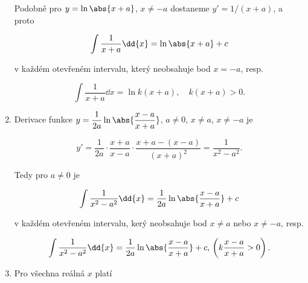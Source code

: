 \begin{enumerate}
            Podobně pro \(y=\ln\abs{x+a}\), \(x\neq-a\) dostaneme \(y'=1/(x+a)\), a proto
            \begin{fleqn}[\parindent]
              \begin{equation*}
                \int\frac{1}{x+a}\dd{x} = \ln\abs{x+a} + c
              \end{equation*}
            \end{fleqn} 
            v každém otevřeném intervalu, který neobsahuje bod \(x=-a\), resp. 
            \begin{fleqn}[\parindent]
              \begin{equation*}
                \int\frac{1}{x+a}\dd{x} = \ln k(x+a), \quad k(x+a)>0.
              \end{equation*}
            \end{fleqn} 
      \item Derivace funkce \(y=\dfrac{1}{2a}\ln\abs{\dfrac{x-a}{x+a}}\), \(a\neq0\), \(x\neq a\),
            \(x\neq -a\) je
            \begin{fleqn}[\parindent]
              \begin{equation*}
                y'=\frac{1}{2a}\cdot\frac{x+a}{x-a}\cdot\frac{x+a-(x-a)}{(x+a)^2} 
                  = \frac{1}{x^2-a^2}.
              \end{equation*}
            \end{fleqn} 
            Tedy pro \(a\neq0\) je
            \begin{fleqn}[\parindent]
              \begin{equation*}
                \int\frac{1}{x^2-a^2}\dd{x} = \frac{1}{2a}\ln\abs{\dfrac{x-a}{x+a}} + c
              \end{equation*}
            \end{fleqn} 
            v každém otevřeném intervalu, kerý neobsahuje bod \(x\neq a\) nebo \(x\neq -a\), resp.
            \begin{fleqn}[\parindent] 
              \begin{equation*}
                \int\frac{1}{x^2-a^2}\dd{x} = \frac{1}{2a}\ln\abs{\dfrac{x-a}{x+a}} + c,
                \, \left(k\dfrac{x-a}{x+a}>0\right).
              \end{equation*}
            \end{fleqn} 
      \item Pro všechna reálná \(x\) platí
            \begin{fleqn}[\parindent]      
              \begin{equation*}

\end{equation*}
\end{fleqn}
\end{enumerate}

